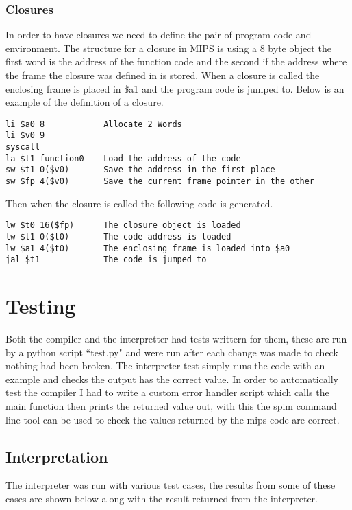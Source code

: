\documentclass{article}
\begin{document}
\subsubsection{Closures}

In order to have closures we need to define the pair of program code and environment.
The structure for a closure in MIPS is using a 8 byte object the first word is
the address of the function code and the second if the address where the frame
the closure was defined in is stored. When a closure is called the enclosing frame is
placed in \$a1 and the program code is jumped to. Below is an example of the definition
of a closure.

\begin{lstlisting}
li $a0 8            Allocate 2 Words
li $v0 9
syscall
la $t1 function0    Load the address of the code
sw $t1 0($v0)       Save the address in the first place
sw $fp 4($v0)       Save the current frame pointer in the other
\end{lstlisting}

Then when the closure is called the following code is generated.

\begin{lstlisting}
lw $t0 16($fp)      The closure object is loaded
lw $t1 0($t0)       The code address is loaded
lw $a1 4($t0)       The enclosing frame is loaded into $a0
jal $t1             The code is jumped to
\end{lstlisting}

\newpage
{}
{}

\newpage

\section{Testing}

Both the compiler and the interpretter had tests writtern for them, these are run
by a python script ``test.py" and were run after each change was made to check
nothing had been broken. The interpreter test simply runs the code with an example
and checks the output has the correct value. In order to automatically test the
compiler I had to write a custom error handler script which calls the main function
then prints the returned value out, with this the spim command line tool can be used
to check the values returned by the mips code are correct.

\subsection{Interpretation}
The interpreter was run with various test cases, the results from some of these
cases are shown below along with the result returned from the interpreter.
\end{document}

